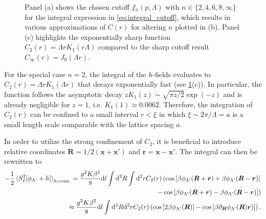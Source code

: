 \begin{figure}
    \caption{Panel (a) shows the chosen cutoff $f_n(p,\Lambda)$ with $n\in\{2,4,6,8,\infty\}$ for the integral expression in \cref{eq:integral_cutoff}, which results in various approximations of $C(r)$ for altering $n$ plotted in (b). Panel (c) highlights the exponentially sharp function $C_2(r)=\Lambda rK_1(r\Lambda)$ compared to the sharp cutoff result $C_\infty(r)=J_0(\Lambda r)$.}
    \label{fig:rg_cutoff}
\end{figure}
For the special case $n=2$, the integral of the $h$-fields evaluates to $C_2(r)=\Lambda r K_1(\Lambda r)$ that decays exponentially fast (see \cref{fig:rg_cutoff}(c)).
In particular, the function follows the asymptotic decay $z K_1(z) \sim \sqrt{\pi z/2}\exp(-z)$ and is already negligible for $z=1$, i.e. $K_1(1)\approx0.0062$.
Therefore, the integration of $C_2(r)$ can be confined to a small interval $r<\xi$ in which $\xi\sim2\pi/\Lambda=a$ is a small length scale comparable with the lattice spacing $a$.

In order to utilize the strong confinement of $C_2$, it is beneficial to introduce relative coordinates ${\bm R} = 1/2({\bm x}+{\bm x'})$ and ${\bm r} = {\bm x}-{\bm x'}$.
The integral can then be rewritten to
\begin{align}
    -\frac12\braket{S^2_I[\phi_{\Lambda'}+h]}_{h,{\rm conn.}}
    =
    \frac{g^2K\beta^2}8\mathrm d l\int\mathrm d^2R\int\mathrm d^2r
    C_2(r)
    \left(
        \cos\left[ \beta\phi_{\Lambda'}({\bm R}+{\bm r})+\beta\phi_{\Lambda'}({\bm R}-{\bm r}) \right]
        \right.
        \label{eq:rg_int_1}\\
        \left.-
        \cos\left[ \beta\phi_{\Lambda'}({\bm R}+{\bm r})-\beta\phi_{\Lambda'}({\bm R}-{\bm r}) \right]
    \right)
    \label{eq:rg_int_2}
    \\
    \approx
    \frac{g^2K\beta^2}{8}\mathrm d l\int\mathrm d^2R\mathrm d^2rC_2(r)
    \left(
        \cos\left[ 2\beta\phi_{\Lambda'}({\bm R}) \right]
        -
        \cos\left[ \beta\partial_{\bm R}\phi_{\Lambda'}({\bm R}){\bm r}) \right]
    \right).
    \label{eq:rg_int_rel_coords}
\end{align}


